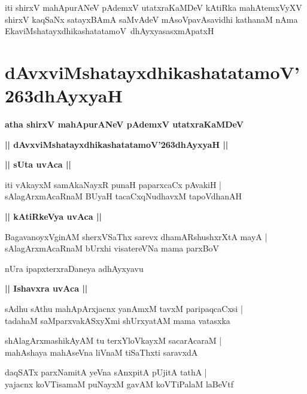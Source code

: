\documentclass[twoside,12pt,openright]{book}
\def\S{\char'263}
\newcounter{shloka}[chapter]
\def\uvaca#1{\centerline{{\large\textbf{#1}}}}
\begin{document}
\begin{center}
iti shirxV mahApurANeV pAdemxV utatxraKaMDeV kAtiRka mahAtemxVyXV shirxV kaqSaNx satayxBAmA 
saMvAdeV mAsoVpavAsavidhi kathanaM nAma EkaviMshatayxdhikashatatamoV\ dhAyxyasasxmApatxH 
\end{center}

\chapter{dAvxviMshatayxdhikashatatamoV\S dhAyxyaH}

\begin{center}
{\LARGE\bfseries atha shirxV mahApurANeV pAdemxV utatxraKaMDeV}
\end{center}

\begin{center}
{\LARGE\bfseries || dAvxviMshatayxdhikashatatamoV\S dhAyxyaH || }
\end{center}

\uvaca{|| sUta uvAca ||}

\begin{shloka}%
iti vAkayxM samAkaNayxR punaH paparxcaCx pAvakiH |\\
sAlagArxmAcaRnaM BUyaH tacaCxqNudhavxM tapoVdhanAH
\end{shloka}

\uvaca{|| kAtiRkeVya uvAca ||}

\begin{shloka}%
BagavanoyxVginAM sherxVSaThx sarevx dhamARshushxrXtA mayA |\\
sAlagArxmAcaRnaM bUrxhi visatereVNa mama parxBoV 
\end{shloka}

\begin{center}
nUra ipapxterxraDaneya adhAyxyavu
\end{center}

\uvaca{|| Ishavxra uvAca ||}

\begin{shloka}%
sAdhu sAthu mahApArxjacnx yanAmxM tavxM paripaqcaCxsi |\\
tadahaM saMparxvakASxyXmi shUrxyatAM mama vatasxka
\end{shloka}

\begin{shloka}%
shAlagArxmashikAyAM tu terxYloVkayxM sacarAcaraM |\\
mahAshaya mahAseVna liVnaM tiSaThxti saravxdA 
\end{shloka}

\begin{shloka}%
daqSATx parxNamitA yeVna sAnxpitA pUjitA tathA |\\
yajacnx koVTisamaM puNayxM gavAM koVTiPalaM laBeVtf
\end{shloka}
\end{document}

